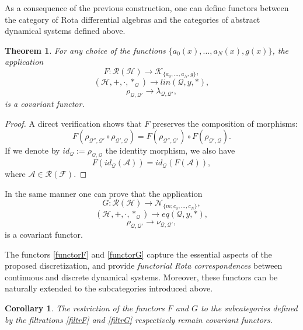 \documentclass[10pt]{amsart}
\numberwithin{equation}{section}
\newtheorem{theorem}{Theorem}
\newtheorem{corollary}{Corollary}
\theoremstyle{definition}
\begin{document}
As a consequence of the previous construction, one can define functors
between the category of Rota differential algebras and the categories of
abstract dynamical systems defined above.
\begin{theorem}
\label{functor}
For any choice of the functions
$\{ a_{0}(x),\ldots , a_{N}(x),g(x)\}$, the application
\begin{equation}
F: \mathcal{R}(\mathcal{H}) \longrightarrow \mathcal{K}_{\{ a_{0},
\ldots , a_{N},g \}},
\label{functorF}
\end{equation}
\begin{equation*}
(\mathcal{H},+, \cdot , *_{\mathcal{Q}}) \longrightarrow lin(
\mathcal{Q},y,*),
\end{equation*}
\begin{equation*}
\rho _{\mathcal{Q},\mathcal{Q}'} \longrightarrow \lambda _{
\mathcal{Q},\mathcal{Q}'},
\end{equation*}
is a covariant functor.
\end{theorem}
\begin{proof}
A direct verification shows that $F$ preserves the composition of morphisms:
\begin{equation*}
F(\rho _{\mathcal{Q}'',\mathcal{Q}'}\circ \rho _{\mathcal{Q}',
\mathcal{Q}})=F(\rho _{\mathcal{Q}'',\mathcal{Q}'})\circ F(\rho _{
\mathcal{Q}',\mathcal{Q}}).
\end{equation*}
If we denote by $id_{\mathcal{Q}}:=\rho _{\mathcal{Q},\mathcal{Q}}$ the
identity morphism, we also have
\begin{equation*}
F(id_{\mathcal{Q}}(\mathcal{A}))=id_{\mathcal{Q}}(F(\mathcal{A})),
\end{equation*}
where $\mathcal{A}\in \mathcal{R}(\mathcal{F})$.
\end{proof}
 In the same manner one can prove that the application
\begin{equation}
G: \mathcal{R}(\mathcal{H}) \longrightarrow \mathcal{N}_{\{ m; c_{0},
\ldots , c_{N} \}},
\label{functorG}
\end{equation}
\begin{equation*}
(\mathcal{H},+, \cdot , *_{\mathcal{Q}}) \longrightarrow eq(
\mathcal{Q},y,*),
\end{equation*}
\begin{equation*}
\rho _{\mathcal{Q},\mathcal{Q}'} \longrightarrow \nu _{\mathcal{Q},
\mathcal{Q}'},
\end{equation*}
is a covariant functor.

The functors  \eqref{functorF} and  \eqref{functorG} capture the essential
aspects of the proposed discretization, and provide
\textit{functorial Rota correspondences} between continuous and discrete
dynamical systems. Moreover, these functors can be naturally extended to
the subcategories introduced above.
\begin{corollary}
\label{cor2}
The restriction of the functors $F$ and $G$ to the subcategories defined
by the filtrations  \eqref{filtrF} and  \eqref{filtrG} respectively remain
covariant functors.
\end{corollary}
\end{document}
